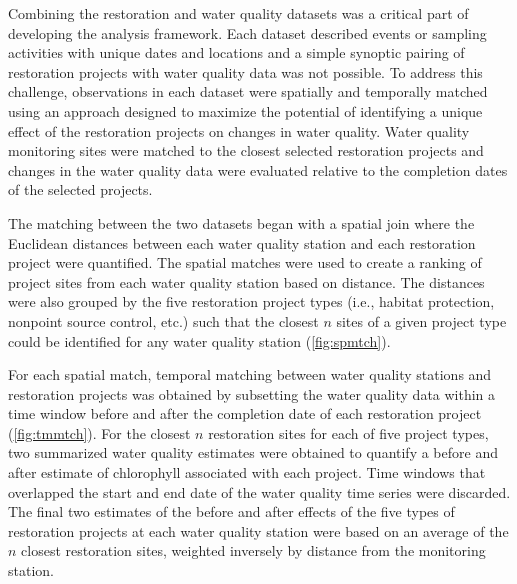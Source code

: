 \documentclass[]{article}
\begin{document}
Combining the restoration and water quality datasets was a critical part
of developing the analysis framework. Each dataset described events or
sampling activities with unique dates and locations and a simple
synoptic pairing of restoration projects with water quality data was not
possible. To address this challenge, observations in each dataset were
spatially and temporally matched using an approach designed to maximize
the potential of identifying a unique effect of the restoration projects
on changes in water quality. Water quality monitoring sites were matched
to the closest selected restoration projects and changes in the water
quality data were evaluated relative to the completion dates of the
selected projects.

The matching between the two datasets began with a spatial join where
the Euclidean distances between each water quality station and each
restoration project were quantified. The spatial matches were used to
create a ranking of project sites from each water quality station based
on distance. The distances were also grouped by the five restoration
project types (i.e., habitat protection, nonpoint source control, etc.)
such that the closest \(n\) sites of a given project type could be
identified for any water quality station (\cref{fig:spmtch}).

For each spatial match, temporal matching between water quality stations
and restoration projects was obtained by subsetting the water quality
data within a time window before and after the completion date of each
restoration project (\cref{fig:tmmtch}). For the closest \(n\)
restoration sites for each of five project types, two summarized water
quality estimates were obtained to quantify a before and after estimate
of chlorophyll associated with each project. Time windows that
overlapped the start and end date of the water quality time series were
discarded. The final two estimates of the before and after effects of
the five types of restoration projects at each water quality station
were based on an average of the \(n\) closest restoration sites,
weighted inversely by distance from the monitoring station.
\end{document}

